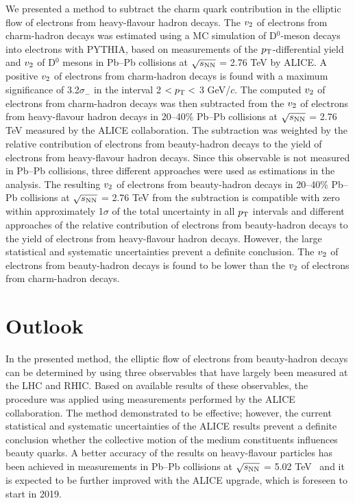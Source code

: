 \documentclass[11pt,a4paper]{article}
\providecommand{\pT}{$p_{\rm T}$ }
\providecommand{\vtwo}{$v_{\rm 2}$ }
\providecommand{\snn}{$\sqrt{s_{\rm NN}}$ }
\begin{document}
We presented a method to subtract the charm quark contribution in the elliptic flow of electrons from heavy-flavour hadron decays.
The \vtwo of electrons from charm-hadron decays was estimated using a MC simulation of D$^0$-meson  decays  into electrons with PYTHIA, based on  measurements of the $p_{\rm T}$-differential yield  and \vtwo of D$^{0}$ mesons  in Pb--Pb collisions at \snn = 2.76 TeV by  ALICE.
A positive \vtwo of electrons from charm-hadron decays is found with a maximum significance of 3.2$\sigma_{-}$ in the interval 2 $<  p_{\rm T} <$ 3 GeV/$c$.
The computed \vtwo  of electrons from charm-hadron decays was  then subtracted from the  \vtwo of electrons from heavy-flavour hadron decays in  20--40\%  Pb--Pb collisions at \snn = 2.76 TeV measured by the ALICE collaboration. 
The subtraction was weighted by the relative contribution of electrons from beauty-hadron decays to the yield of electrons from heavy-flavour hadron decays. Since this observable is not measured in Pb--Pb collisions, three different approaches were used as estimations in the analysis. 
The resulting \vtwo of electrons from beauty-hadron decays in 20--40\%  Pb--Pb collisions at \snn = 2.76 TeV from the subtraction is compatible with zero within approximately 1$\sigma$  of the total uncertainty in all \pT intervals and different  approaches of the relative contribution of electrons from beauty-hadron decays to the yield of electrons from heavy-flavour hadron decays. However, the large statistical and systematic uncertainties prevent a definite conclusion. The \vtwo of electrons from beauty-hadron decays is found to be lower than the \vtwo of electrons from charm-hadron decays.

 
 
 \section{Outlook}
 \label{Sec:Outlook}


In the presented method, the elliptic flow of electrons from beauty-hadron decays can be determined by using three observables that have largely been measured at the LHC and RHIC.
Based on  available results of these observables, the procedure was applied using measurements  performed by the ALICE collaboration. The method  demonstrated to be effective; however, the current statistical and systematic uncertainties of the ALICE results prevent a definite conclusion whether the collective motion of the medium constituents influences beauty quarks. 
A better accuracy of the results on heavy-flavour particles has been achieved in measurements in Pb--Pb collisions at \snn = 5.02 TeV~\cite{Acharya:2017qps} and it is expected to be further improved with the ALICE upgrade, which is foreseen to start in 2019. 
\end{document}
